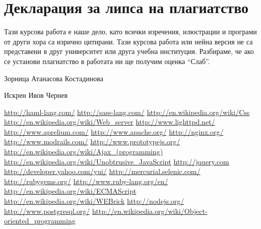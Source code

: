 \documentclass[a4paper]{article}
\begin{document}
\newpage

\section{Декларация за липса на плагиатство}
Тази курсова работа е наше дело, като всички изречения, илюстрации и програми
от други хора са изрично цитирани.  Тази курсова работа или нейна версия не са
представени в друг университет или друга учебна институция.  Разбираме, че ако
се установи плагиатство в работата ни ще получим оценка “Слаб”.

\vspace{2cm}
Зорница Атанасова Костадинова

\vspace{2cm}
Искрен Ивов Чернев

\newpage

\begin{thebibliography}{99}
   \url{http://haml-lang.com/}
   \url{http://sass-lang.com/}
   \url{http://en.wikipedia.org/wiki/Css}
   \url{http://en.wikipedia.org/wiki/Web\_server}
   \url{http://www.lighttpd.net/}
   \url{http://www.aprelium.com/}
   \url{http://www.apache.org/}
   \url{http://nginx.org/}
   \url{http://www.modrails.com/}
   \url{http://www.prototypejs.org/}
   \url{http://en.wikipedia.org/wiki/Ajax\_(programming)}
   \url{http://en.wikipedia.org/wiki/Unobtrusive\_JavaScript}
   \url{http://jquery.com}
   \url{http://developer.yahoo.com/yui/}
   \url{http://mercurial.selenic.com/}
   \url{http://rubygems.org/}
   \url{http://www.ruby-lang.org/en/}
   \url{http://en.wikipedia.org/wiki/ECMAScript}
   \url{http://en.wikipedia.org/wiki/WEBrick}
   \url{http://nodejs.org/}
   \url{http://www.postgresql.org/}
   \url{http://en.wikipedia.org/wiki/Object-oriented\_programming}
\end{thebibliography}
\end{document}
